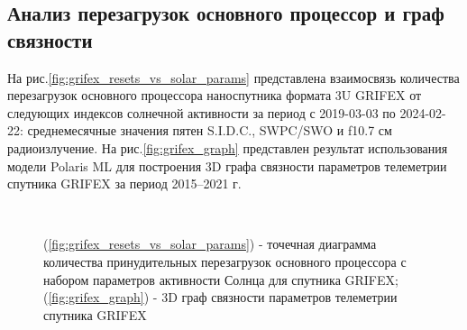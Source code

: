 \documentclass[14pt, a4paper]{extreport}
\begin{document}
    \subsection{Анализ перезагрузок основного процессор и граф связности}

    На рис.\ref{fig:grifex_resets_vs_solar_params} представлена взаимосвязь количества перезагрузок основного процессора наноспутника формата 3U GRIFEX от следующих индексов солнечной активности за период с 2019-03-03 по 2024-02-22: среднемесячные значения пятен S.I.D.C., SWPC/SWO и f10.7 см радиоизлучение.
    На рис.\ref{fig:grifex_graph} представлен результат использования модели Polaris ML для построения 3D графа связности параметров телеметрии спутника GRIFEX за период 2015–2021 г.

    \begin{figure}[h!tbp]
        \centering
        \hfill
        ~\caption{(\ref{fig:grifex_resets_vs_solar_params}) - точечная диаграмма количества принудительных перезагрузок основного процессора с набором параметров активности Солнца для спутника GRIFEX; (\ref{fig:grifex_graph}) - 3D граф связности параметров телеметрии спутника GRIFEX}
        \label{fig:combined_figure}
    \end{figure}
\end{document}
